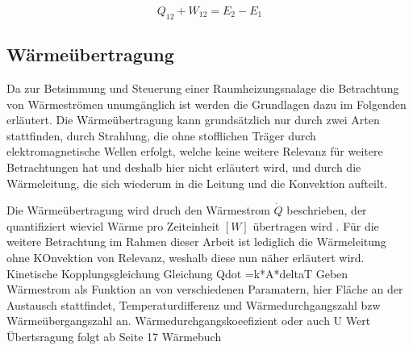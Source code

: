 \begin{equation}
\label{eq:hauptsatz}
Q_{12} + W_{12} = E_2 - E_1
\end{equation}


\subsection{Wärmeübertragung}
Da zur Betsimmung und Steuerung einer Raumheizungsnalage die Betrachtung von Wärmeströmen unumgänglich ist werden die Grundlagen dazu im Folgenden erläutert.
Die Wärmeübertragung kann grundsätzlich nur durch zwei Arten stattfinden, durch Strahlung, die ohne stofflichen Träger durch elektromagnetische Wellen erfolgt, welche keine weitere Relevanz für weitere Betrachtungen hat und deshalb hier nicht erläutert wird, und durch die Wärmeleitung, die sich wiederum in die Leitung und die Konvektion aufteilt. \cite[S.~3f.]{bo14}

Die Wärmeübertragung wird druch den Wärmestrom $\dot{Q}$ beschrieben, der quantifiziert wieviel Wärme pro Zeiteinheit $[W]$ übertragen wird \cite[S.~5]{bo14}.
Für die weitere Betrachtung im Rahmen dieser Arbeit ist lediglich die Wärmeleitung ohne KOnvektion von Relevanz, weshalb diese nun näher erläutert wird.
Kinetische Kopplungsgleichung\cite[S.~7]{bo14}
Gleichung Qdot =k*A*deltaT
Geben Wärmestrom als Funktion an von verschiedenen Paramatern, hier Fläche an der Austausch stattfindet, Temperaturdifferenz und Wärmedurchgangszahl bzw Wärmeübergangszahl an.
Wärmedurchgangskoeefizient oder auch U Wert
Übertsragung folgt ab Seite 17 Wärmebuch
